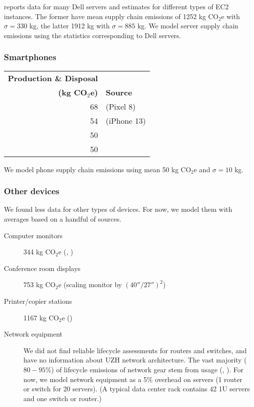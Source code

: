 \documentclass[11pt]{article}
\newcommand{\assumption}[1]{{#1}}
\begin{document}
\textcite{davy2021} reports data for many Dell servers and estimates for different types of EC2 instances.
The former have mean supply chain emissions of 1252 kg CO$_2$e with $\sigma = 330$ kg, the latter
1912 kg with $\sigma = 885$ kg.
\assumption{We model server supply chain emissions using the statistics corresponding to Dell servers.}

\subsubsection{Smartphones}

\begin{center}
\begin{tabular}{|r|l|}
\hline
\textbf{Production \& Disposal} & \\
\textbf{(kg CO$_2$e)} & \textbf{Source} \\ \hline
68 & \textcite{googlepixel8} (Pixel 8)\\ \hline
54 & \textcite{appleiphone13} (iPhone 13)\\ \hline
50 & \textcite{unctadder2024} \\ \hline
50 & \textcite{lovehagen2023} \\ \hline
\end{tabular}
\label{tab:embodied_emissions:phones}
\end{center}

\assumption{We model phone supply chain emissions using mean 50 kg CO$_2$e and $\sigma = 10$ kg.}

\subsubsection{Other devices}

We found less data for other types of devices. For now, we model them with averages based
on a handful of sources.

\begin{description}
    \item[Computer monitors] 344 kg CO$_2$e (\textcite{teehan2013}, \textcite{dellpcf})
    \item[Conference room displays] 753 kg CO$_2$e (scaling monitor by $(40''/27'')^2$)
    \item[Printer/copier stations] 1167 kg CO$_2$e (\textcite{ecoinvent})
    \item[Network equipment] We did not find reliable lifecycle assessments for routers and switches,
      and have no information about UZH network architecture. The vast majority ($80-95\%$) of
      lifecycle emissions of network gear stem from usage (\textcite{cisco2024}, \textcite{jacob2023}).
      For now, we model network equipment as a 5\% overhead on servers (1 router or switch for 20 servers).
      (A typical data center rack contains 42 1U servers and one switch or router.)
\end{description}
\end{document}
